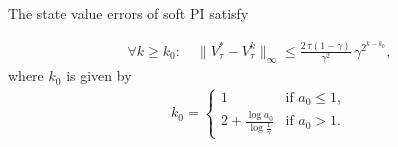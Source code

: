 \begin{theorem}\label{thm:softPI-quadratic}
The state value errors of soft PI satisfy 

\begin{align*}
    \forall k\geq k_0 : \quad \|V_\tau^*-V_\tau^k\|_\infty \leq \frac{2\,\tau(1-\gamma)}{\gamma^2}\,\gamma^{\displaystyle 2^{ k-k_0}},
\end{align*}
where $k_0$ is given by
\begin{align*}
    k_0 = 
    \left\{ 
        \begin{array}{cc}
            1 & \mbox{if }a_0 \leq 1, \\
            2+\frac{\log a_0}{\log \frac{1}{\gamma}} & \mbox{if }a_0 > 1.
        \end{array}
    \right.
\end{align*}

\end{theorem}
